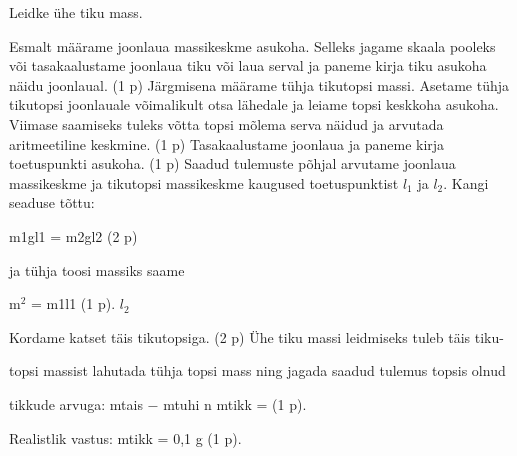 
Leidke ühe tiku mass.

\hint

\solu
Esmalt määrame joonlaua massikeskme asukoha. Selleks jagame skaala pooleks või tasakaalustame joonlaua tiku või laua serval ja paneme kirja tiku asukoha näidu joonlaual. (1 p) Järgmisena määrame tühja tikutopsi massi. Asetame tühja tikutopsi joonlauale võimalikult otsa lähedale ja leiame topsi keskkoha asukoha. Viimase saamiseks tuleks võtta topsi mõlema serva näidud ja arvutada aritmeetiline keskmine. (1 p) Tasakaalustame joonlaua ja paneme kirja toetuspunkti asukoha. (1 p) Saadud tulemuste põhjal arvutame joonlaua massikeskme ja tikutopsi massikeskme kaugused toetuspunktist $l_1$ ja $l_2$. Kangi seaduse tõttu:

m1gl1 = m2gl2 (2 p)

ja tühja toosi massiks saame

m$^2$ = m1l1 (1 p). $l_2$

Kordame katset täis tikutopsiga. (2 p) Ühe tiku massi leidmiseks tuleb täis tiku-

topsi massist lahutada tühja topsi mass ning jagada saadud tulemus topsis olnud

tikkude arvuga: mtais $-$ mtuhi n mtikk = (1 p).

Realistlik vastus: mtikk = 0,1 g (1 p).
\probend
